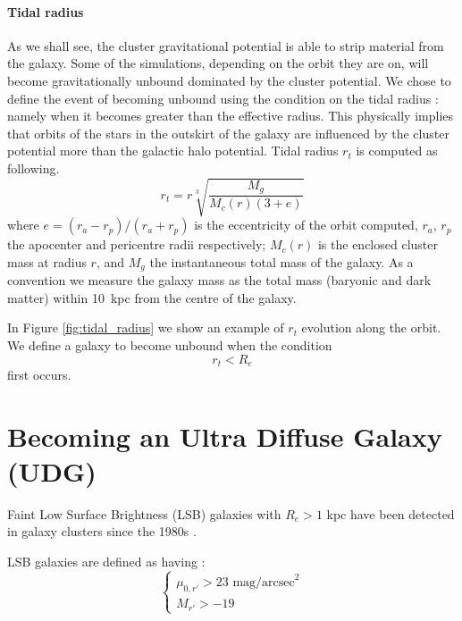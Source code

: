 \paragraph*{Tidal radius}
As we shall see, the cluster gravitational potential is able to strip material from the galaxy. Some of the simulations, depending on the orbit they are on, will become gravitationally unbound dominated by the cluster potential.
We chose to define the event of becoming unbound using the condition on the tidal radius \cite{King1962}: namely when it becomes greater than the effective radius.
This physically implies that orbits of the stars in the outskirt of the galaxy are influenced by the cluster potential more than the galactic halo potential. 
Tidal radius $r_t$ is computed as following.
\begin{equation}
r_t = r \sqrt[3]{\frac{M_g}{M_c(r) (3+e)}}
\label{eq:tidal_radius}
\end{equation}
where $e = (r_a - r_p) / (r_a + r_p)$ is the eccentricity of the orbit computed, $r_a$, $r_p$ the apocenter and pericentre radii respectively; $M_c(r)$ is the enclosed cluster mass at radius $r$, and $M_g$ the instantaneous total mass of the galaxy.
As a convention we measure the galaxy mass as the total mass (baryonic and dark matter) within 10~kpc from the centre of the galaxy.

In Figure \ref{fig:tidal_radius} we show an example of $r_t$ evolution along the orbit. %
We define a galaxy to become unbound when the condition 
\begin{equation}
    r_t<R_e
\label{eq:tidal_radius_condition}
\end{equation}
first occurs.

\section{Becoming an Ultra Diffuse Galaxy (UDG)}
\label{sec:UDG}

Faint Low Surface Brightness (LSB) galaxies with $R_e > 1$ kpc have been detected in galaxy clusters since the 1980s \citep[e.g.][]{Sandage1984}.

LSB galaxies are defined as having \citep{Venhola2017}:
\begin{equation}
\begin{cases}
 \mu_{0,r'} > 23 \mbox{ mag/arcsec}^2\\
 M_{r'} > -19
\end{cases}
\end{equation}

